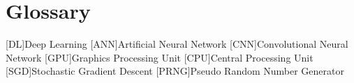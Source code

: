 \chapter{Glossary}

\footnotesize
\SingleSpacing

\begin{multicols}{2}
\begin{acronym}[AAAAAA]

	[DL]{Deep Learning}
	[ANN]{Artificial Neural Network}
	[CNN]{Convolutional Neural Network}
	[GPU]{Graphics Processing Unit}
	[CPU]{Central Processing Unit}
	[SGD]{Stochastic Gradient Descent}
	[PRNG]{Pseudo Random Number Generator}

\end{acronym}
\end{multicols}
